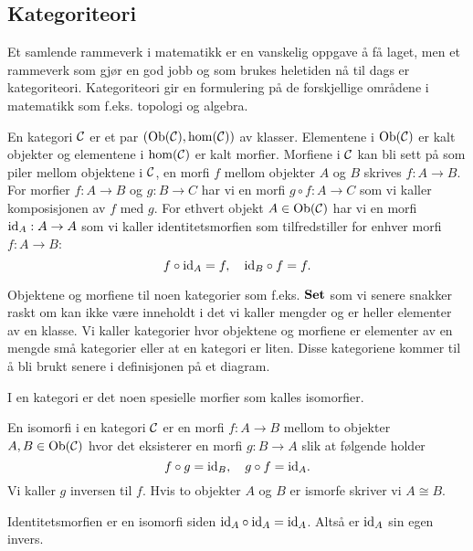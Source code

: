 \subsection{Kategoriteori}\label{Ssek:Katgoriteori}
Et samlende rammeverk i matematikk er en vanskelig oppgave å få laget, men et rammeverk som gjør en god jobb og som brukes heletiden nå til dags er kategoriteori. Kategoriteori gir en formulering på de forskjellige områdene i matematikk som f.eks. topologi og algebra.

\begin{definisjon}\label{Def:Kategori}
    En kategori $\mathcal{C}$ er et par $(\textnormal{Ob}(\mathcal{C}),\hom(\mathcal{C}))$ av klasser. Elementene i $\textnormal{Ob}(\mathcal{C})$ er kalt objekter og elementene i $\hom(\mathcal{C})$ er kalt morfier. Morfiene i $\mathcal{C}$ kan bli sett på som piler mellom objektene i $\mathcal{C}$, en morfi $f$ mellom objekter $A$ og $B$ skrives $f:A\to B$.
    For morfier $f: A\to B$ og $g: B\to C$ har vi en morfi $g\circ f: A\to C$ som vi kaller komposisjonen av $f$ med $g$.
    For ethvert objekt $A\in\textnormal{Ob}(\mathcal{C})$ har vi en morfi $\textnormal{id}_A: A\to A$ som vi kaller identitetsmorfien som tilfredstiller for enhver morfi $f:A\to B$:
    \[f\circ\textnormal{id}_A = f,\quad \textnormal{id}_B\circ f = f.\]
\end{definisjon}

\begin{bemerk}\label{rem:smaakat}
  Objektene og morfiene til noen kategorier som f.eks. $\textnormal{\textbf{Set}}$ som
  vi senere snakker raskt om kan ikke være inneholdt i det vi
  kaller mengder og er heller elementer av en klasse. Vi kaller
  kategorier hvor objektene og morfiene er elementer av en mengde
  små kategorier eller at en kategori er liten. Disse kategoriene kommer til å bli brukt senere i definisjonen på et diagram.
\end{bemerk}

I en kategori er det noen spesielle morfier som kalles isomorfier.
\begin{definisjon}\label{Def:Iso}
    En isomorfi i en kategori $\mathcal{C}$ er en morfi $f:A\to B$ mellom to objekter $A,B\in\textnormal{Ob}(\mathcal{C})$ hvor det eksisterer en morfi $g:B\to A$ slik at følgende holder
    \[f\circ g = \textnormal{id}_B,\quad g\circ f = \textnormal{id}_A.\]
    Vi kaller $g$ inversen til $f$. Hvis to objekter $A$ og $B$ er ismorfe skriver vi $A\cong B$.
\end{definisjon}

\begin{bemerk}\label{Rem:IdIso}
    Identitetsmorfien er en isomorfi siden $\textnormal{id}_A\circ\textnormal{id}_A = \textnormal{id}_A$. Altså er $\textnormal{id}_A$ sin egen invers.
\end{bemerk}

